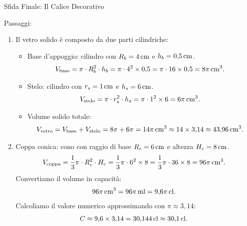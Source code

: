 \begin{esercizio}{Sfida Finale: Il Calice Decorativo}

\responsespace{5.5cm}

\begin{soluzione}
  Passaggi:
  \begin{enumerate}[label=\alph*)]
    \item Il vetro solido è composto da due parti cilindriche:
    \begin{itemize}
      \item Base d'appoggio: cilindro con $R_b = 4\,\mathrm{cm}$ e $h_b = 0{,}5\,\mathrm{cm}$.
      \[
      V_{\text{base}} = \pi \cdot R_b^2 \cdot h_b = \pi \cdot 4^2 \times 0{,}5 = \pi \cdot 16 \times 0{,}5 = 8\pi\,\mathrm{cm^3}.
      \]
      \item Stelo: cilindro con $r_s = 1\,\mathrm{cm}$ e $h_s = 6\,\mathrm{cm}$.
      \[
      V_{\text{stelo}} = \pi \cdot r_s^2 \cdot h_s = \pi \cdot 1^2 \times 6 = 6\pi\,\mathrm{cm^3}.
      \]
      \item Volume solido totale:
      \[
      V_{\text{vetro}} = V_{\text{base}} + V_{\text{stelo}} = 8\pi + 6\pi = 14\pi\,\mathrm{cm^3} \approx 14 \times 3{,}14 \approx 43{,}96\,\mathrm{cm^3}.
      \]
    \end{itemize}
    \item Coppa conica: cono con raggio di base $R_c = 6\,\mathrm{cm}$ e altezza $H_c = 8\,\mathrm{cm}$.
    \[
    V_{\text{coppa}} = \frac{1}{3} \pi \cdot R_c^2 \cdot H_c = \frac{1}{3} \pi \cdot 6^2 \times 8 = \frac{1}{3} \pi \cdot 36 \times 8 = 96\pi\,\mathrm{cm^3}.
    \]
    Convertiamo il volume in capacità:
    \[
    96\pi\,\mathrm{cm^3} = 96\pi\,\mathrm{ml} = 9{,}6\pi\,\mathrm{cl}.
    \]
    Calcoliamo il valore numerico approssimando con $\pi \approx 3{,}14$:
    \[
    C \approx 9{,}6 \times 3{,}14 = 30{,}144\,\mathrm{cl} \approx 30{,}1\,\mathrm{cl}.
    \]
  \end{enumerate}
\end{soluzione}
\end{esercizio}
